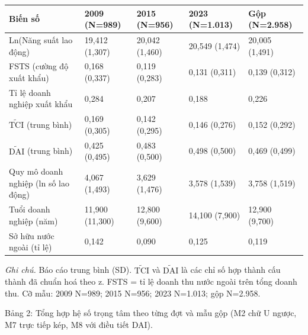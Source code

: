 \documentclass[12pt,a4paper]{article}
\begin{document}
\begin{longtable}[]{@{}lllll@{}}
\toprule\noalign{}
Biến số & 2009 (N=989) & 2015 (N=956) & 2023 (N=1.013) & Gộp
(N=2.958) \\
\midrule\noalign{}
\endhead
\bottomrule\noalign{}
\endlastfoot
Ln(Năng suất lao động) & 19,412 (1,307) & 20,042 (1,460) & 20,549
(1,474) & 20,005 (1,491) \\
FSTS (cường độ xuất khẩu) & 0,168 (0,337) & 0,119 (0,283) & 0,131
(0,311) & 0,139 (0,312) \\
Tỉ lệ doanh nghiệp xuất khẩu & 0,284 & 0,207 & 0,188 & 0,226 \\
\(\tilde{\mathrm{TCI}}\) (trung bình) & 0,169 (0,305) & 0,142 (0,295) &
0,146 (0,276) & 0,152 (0,292) \\
\(\tilde{\mathrm{DAI}}\) (trung bình) & 0,425 (0,495) & 0,483 (0,500) &
0,498 (0,500) & 0,469 (0,499) \\
Quy mô doanh nghiệp (ln số lao động) & 4,067 (1,493) & 3,629 (1,476) &
3,578 (1,539) & 3,758 (1,519) \\
Tuổi doanh nghiệp (năm) & 11,900 (11,300) & 12,800 (9,600) & 14,100
(7,900) & 12,900 (9,700) \\
Sở hữu nước ngoài (tỉ lệ) & 0,142 & 0,090 & 0,125 & 0,119 \\
\end{longtable}

\emph{Ghi chú.} Báo cáo trung bình (SD). \(\tilde{\mathrm{TCI}}\) và
\(\tilde{\mathrm{DAI}}\) là các chỉ số hợp thành cấu thành đã chuẩn hoá
theo z. FSTS = tỉ lệ doanh thu nước ngoài trên tổng doanh thu. Cỡ mẫu:
2009 N=989; 2015 N=956; 2023 N=1.013; gộp N=2.958.

Bảng 2: Tổng hợp hệ số trọng tâm theo từng đợt và mẫu gộp (M2 chữ U
ngược, M7 trực tiếp kép, M8 với điều tiết DAI).
\end{document}
